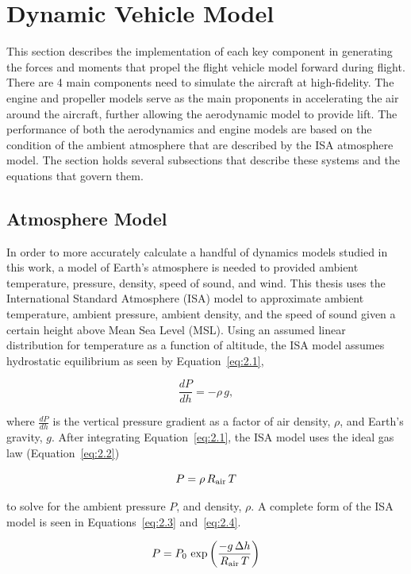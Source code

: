 \documentclass[12pt]{report}
\begin{document}
\clearpage
\section{Dynamic Vehicle Model}
This section describes the implementation of each key component in generating the forces and moments that propel the flight vehicle model forward during flight. There are 4 main components need to simulate the aircraft at high-fidelity. The engine and propeller models serve as the main proponents in accelerating the air around the aircraft, further allowing the aerodynamic model to provide lift. The performance of both the aerodynamics and engine models are based on the condition of the ambient atmosphere that are described by the ISA atmosphere model. The section holds several subsections that describe these systems and the equations that govern them.
\clearpage
\subsection{Atmosphere Model}
In order to more accurately calculate a handful of dynamics models studied in this work, a model of Earth's atmosphere is needed to provided ambient temperature, pressure, density, speed of sound, and wind. This thesis uses the International Standard Atmosphere (ISA) model to approximate ambient temperature, ambient pressure, ambient density, and the speed of sound given a certain height above Mean Sea Level (MSL). Using an assumed linear distribution for temperature as a function of altitude, the ISA model assumes hydrostatic equilibrium as seen by Equation~\ref{eq:2.1},

\begin{equation}
  \frac{dP}{dh} = -\rho \, g,
  \label{eq:2.1}
\end{equation}

where \(\frac{dP}{dh}\) is the vertical pressure gradient as a factor of air density, \( \rho \), and Earth's gravity, \(g\). After integrating Equation~\ref{eq:2.1}, the ISA model uses the ideal gas law (Equation~\ref{eq:2.2})

\begin{equation}
  P = \rho \, R\textsubscript{air} \, T
  \label{eq:2.2}
\end{equation}

to solve for the ambient pressure \(P\), and density, \( \rho \). A complete form of the ISA model is seen in Equations~\ref{eq:2.3} and~\ref{eq:2.4}.

\begin{equation}
  P = P_0\,\exp\left({\frac{-g\,\Delta h}{R\textsubscript{air}\,T}}\right)
  \label{eq:2.3}
\end{equation}
\end{document}
